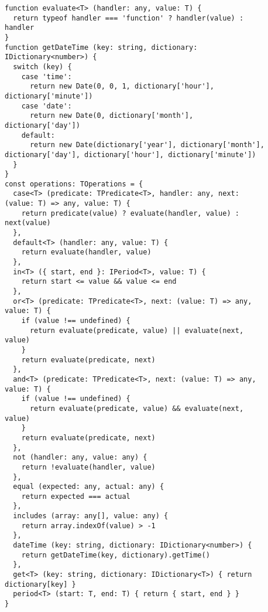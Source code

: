  \hypertarget{app:C}{\label{app:C}}


{
\small
\begin{Verbatim}[frame=single]
function evaluate<T> (handler: any, value: T) {
  return typeof handler === 'function' ? handler(value) :
handler
}  
function getDateTime (key: string, dictionary:
IDictionary<number>) {
  switch (key) {
    case 'time':
      return new Date(0, 0, 1, dictionary['hour'],
dictionary['minute'])
    case 'date':
      return new Date(0, dictionary['month'],
dictionary['day'])
    default:
      return new Date(dictionary['year'], dictionary['month'],
dictionary['day'], dictionary['hour'], dictionary['minute'])
  }
}  
const operations: TOperations = {
  case<T> (predicate: TPredicate<T>, handler: any, next:
(value: T) => any, value: T) {
    return predicate(value) ? evaluate(handler, value) :
next(value)
  },
  default<T> (handler: any, value: T) {
    return evaluate(handler, value)
  },
  in<T> ({ start, end }: IPeriod<T>, value: T) {
    return start <= value && value <= end
  },
  or<T> (predicate: TPredicate<T>, next: (value: T) => any,
value: T) {
    if (value !== undefined) {
      return evaluate(predicate, value) || evaluate(next,
value)
    }
    return evaluate(predicate, next)
  },
  and<T> (predicate: TPredicate<T>, next: (value: T) => any,
value: T) {
    if (value !== undefined) {
      return evaluate(predicate, value) && evaluate(next,
value)
    }
    return evaluate(predicate, next)
  },
  not (handler: any, value: any) {
    return !evaluate(handler, value)
  },
  equal (expected: any, actual: any) {
    return expected === actual
  },
  includes (array: any[], value: any) {
    return array.indexOf(value) > -1
  },
  dateTime (key: string, dictionary: IDictionary<number>) {
    return getDateTime(key, dictionary).getTime()
  },
  get<T> (key: string, dictionary: IDictionary<T>) { return
dictionary[key] }
  period<T> (start: T, end: T) { return { start, end } }
}
\end{Verbatim}
}

\clearpage